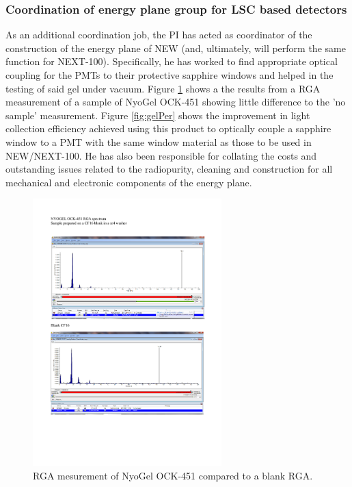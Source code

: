 \documentclass[a4paper,11pt,oneside]{article}
\begin{document}
\subsubsection*{Coordination of energy plane group for LSC based detectors}
As an additional coordination job, the PI has acted as coordinator of
the construction of the energy plane of NEW (and, ultimately, will
perform the same function for NEXT-100). Specifically, he has worked
to find appropriate optical coupling for the PMTs to their protective
sapphire windows and helped in the testing of said gel under
vacuum. Figure \ref{fig:gelRGA} shows a the results from a RGA measurement of
a sample of NyoGel OCK-451 showing little difference to the 'no
sample' measurement. Figure \ref{fig:gelPer} shows the improvement in light
collection efficiency achieved using this product to optically couple
a sapphire window to a PMT with the same window material as those to be
used in NEW/NEXT-100. He has also been responsible for collating the
costs and outstanding issues related to the radiopurity, cleaning and
construction for all mechanical and
electronic components of the energy plane.
\begin{figure}
  \begin{center}
    \includegraphics[width=0.65\textwidth,height=0.55\textwidth]{img/Opt_Gel_1}
  \end{center}
  \caption{RGA mesurement of NyoGel OCK-451 compared to a blank RGA.}
  \label{fig:gelRGA}
\end{figure}
\end{document}
